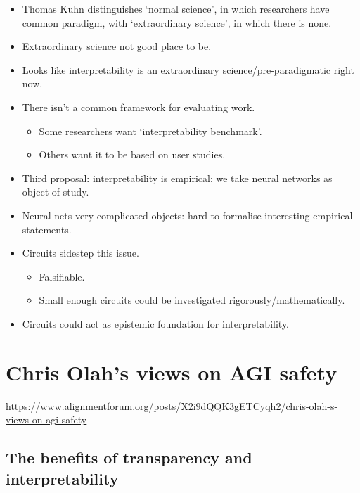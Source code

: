 \begin{itemize}
    \item Thomas Kuhn distinguishes `normal science', in which researchers have common paradigm, with `extraordinary science', in which there is none.
    \item Extraordinary science not good place to be.
    \item Looks like interpretability is an extraordinary science/pre-paradigmatic right now.
    \item There isn't a common framework for evaluating work.
    \begin{itemize}
        \item Some researchers want `interpretability benchmark'.
        \item Others want it to be based on user studies.
    \end{itemize}
    \item Third proposal: interpretability is empirical: we take neural networks as object of study.
    \item Neural nets very complicated objects: hard to formalise interesting empirical statements.
    \item Circuits sidestep this issue.
    \begin{itemize}
        \item Falsifiable.
        \item Small enough circuits could be investigated rigorously/mathematically.
    \end{itemize}
    \item Circuits could act as epistemic foundation for interpretability.
\end{itemize}


\section{Chris Olah's views on AGI safety}

\url{https://www.alignmentforum.org/posts/X2i9dQQK3gETCyqh2/chris-olah-s-views-on-agi-safety}


\subsection{The benefits of transparency and interpretability}


